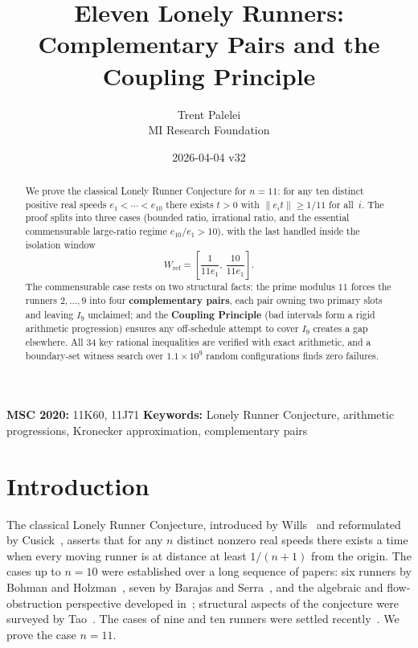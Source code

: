 \documentclass[12pt,a4paper]{amsart}
\title{Eleven Lonely Runners: Complementary Pairs and the Coupling Principle}
\author{Trent Palelei\\[2pt]\small MI Research Foundation}
\date{2026-04-04 \quad v32}
\theoremstyle{definition}
\theoremstyle{remark}
\newcommand{\Wref}{W_{\mathrm{ref}}}
\newcommand{\norm}[1]{\left\|#1\right\|}
\begin{document}
\begin{abstract}
We prove the classical Lonely Runner Conjecture for $n=11$: for any ten distinct positive
real speeds $e_1<\cdots<e_{10}$ there exists $t>0$ with $\norm{e_i t}\ge 1/11$ for all~$i$.
The proof splits into three cases (bounded ratio, irrational ratio, and the essential
commensurable large-ratio regime $e_{10}/e_1>10$), with the last handled inside the
isolation window
\[
  \Wref = \left[\frac{1}{11e_1},\,\frac{10}{11e_1}\right].
\]
The commensurable case rests on two structural facts: the prime modulus $11$ forces the
runners $2,\ldots,9$ into four \textbf{complementary pairs}, each pair owning two primary
slots and leaving $I_9$ unclaimed; and the \textbf{Coupling Principle} (bad intervals form
a rigid arithmetic progression) ensures any off-schedule attempt to cover $I_9$ creates a
gap elsewhere.
All 34 key rational inequalities are verified with exact arithmetic, and a boundary-set
witness search over $1.1\times 10^9$ random configurations finds zero failures.
\end{abstract}

\maketitle

\textbf{MSC 2020:} 11K60, 11J71 \quad
\textbf{Keywords:} Lonely Runner Conjecture, arithmetic progressions,
Kronecker approximation, complementary pairs

\tableofcontents

\section{Introduction}

The classical Lonely Runner Conjecture, introduced by Wills~\cite{Wil67} and reformulated by
Cusick~\cite{Cus73}, asserts that for any $n$ distinct nonzero real speeds there exists a
time when every moving runner is at distance at least $1/(n+1)$ from the origin. The cases
up to $n=10$ were established over a long sequence of papers: six runners by Bohman and
Holzman~\cite{BH01}, seven by Barajas and Serra~\cite{BS08}, and the algebraic and
flow-obstruction perspective developed in~\cite{BGG+98}; structural aspects of the
conjecture were surveyed by Tao~\cite{Tao18}. The cases of nine and ten runners were
settled recently~\cite{Ros25a,Ros25b,Tra25}. We prove the case $n=11$.
\end{document}
